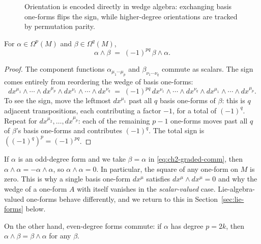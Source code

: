 \begin{figure}[h]
    \centering
    
    \caption{Orientation is encoded directly in wedge algebra: exchanging basis one-forms flips the sign, while higher-degree orientations are tracked by permutation parity.}
    \label{fig:forms-orientation}
\end{figure}

\begin{proposition}\label{prop:graded-comm}
For $\alpha \in \Omega^p(M)$ and $\beta \in \Omega^q(M)$,
\begin{equation}\label{eq:ch2-graded-comm}
\alpha \wedge \beta \;=\; (-1)^{pq}\,\beta \wedge \alpha.
\end{equation}
\end{proposition}

\begin{proof}
The component functions $\alpha_{\mu_1\cdots\mu_p}$ and $\beta_{\nu_1\cdots\nu_q}$ commute as scalars. The sign comes entirely from reordering the wedge of basis one-forms:
\begin{equation*}
dx^{\mu_1}\wedge\cdots\wedge dx^{\mu_p}\wedge dx^{\nu_1}\wedge\cdots\wedge dx^{\nu_q} \;=\; (-1)^{pq}\,dx^{\nu_1}\wedge\cdots\wedge dx^{\nu_q}\wedge dx^{\mu_1}\wedge\cdots\wedge dx^{\mu_p}.
\end{equation*}
To see the sign, move the leftmost $dx^{\mu_1}$ past all $q$ basis one-forms of $\beta$: this is $q$ adjacent transpositions, each contributing a factor $-1$, for a total of $(-1)^q$. Repeat for $dx^{\mu_2}, \dots, dx^{\mu_p}$: each of the remaining $p-1$ one-forms moves past all $q$ of $\beta$'s basis one-forms and contributes $(-1)^q$. The total sign is $\left((-1)^q\right)^p = (-1)^{pq}$.
\end{proof}

\begin{remark}\label{rem:wedge-specials}
If $\alpha$ is an odd-degree form and we take $\beta = \alpha$ in \eqref{eq:ch2-graded-comm}, then $\alpha \wedge \alpha = -\alpha \wedge \alpha$, so $\alpha \wedge \alpha = 0$. In particular, the square of any one-form on $M$ is zero. This is why a single basis one-form $dx^\mu$ satisfies $dx^\mu \wedge dx^\mu = 0$ and why the wedge of a one-form $A$ with itself vanishes in the \emph{scalar-valued} case. Lie-algebra-valued one-forms behave differently, and we return to this in Section~\ref{sec:lie-forms} below.

On the other hand, even-degree forms commute: if $\alpha$ has degree $p = 2k$, then $\alpha \wedge \beta = \beta \wedge \alpha$ for any $\beta$.
\end{remark}

